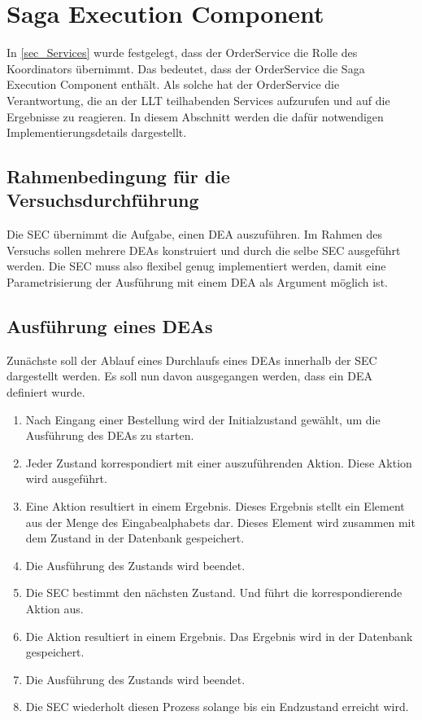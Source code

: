 \section{Saga Execution Component}

In \ref{sec_Services} wurde festgelegt, dass der OrderService die Rolle des Koordinators übernimmt. Das bedeutet, dass der OrderService die Saga Execution Component enthält. Als solche hat der OrderService die Verantwortung, die an der LLT teilhabenden Services aufzurufen und auf die Ergebnisse zu reagieren. In diesem Abschnitt werden die dafür notwendigen Implementierungsdetails dargestellt.

\subsection{Rahmenbedingung für die Versuchsdurchführung}
Die SEC übernimmt die Aufgabe, einen DEA auszuführen. Im Rahmen des Versuchs sollen mehrere DEAs konstruiert und durch die selbe SEC ausgeführt werden. Die SEC muss also flexibel genug implementiert werden, damit eine Parametrisierung der Ausführung mit einem DEA als Argument möglich ist. 

\subsection{Ausführung eines DEAs}
Zunächste soll der Ablauf eines Durchlaufs eines DEAs innerhalb der SEC dargestellt werden. Es soll nun davon ausgegangen werden, dass ein DEA definiert wurde. 

\begin{enumerate}
	\item Nach Eingang einer Bestellung wird der Initialzustand gewählt, um die Ausführung des DEAs zu starten.
	\item Jeder Zustand korrespondiert mit einer auszuführenden Aktion. Diese Aktion wird ausgeführt. 
	\item Eine Aktion resultiert in einem Ergebnis. Dieses Ergebnis stellt ein Element aus der Menge des Eingabealphabets dar. Dieses Element wird zusammen mit dem Zustand in der Datenbank gespeichert. 
	\item Die Ausführung des Zustands wird beendet.
	\item Die SEC bestimmt den nächsten Zustand. Und führt die korrespondierende Aktion aus.
	\item Die Aktion resultiert in einem Ergebnis. Das Ergebnis wird in der Datenbank gespeichert. 
	\item Die Ausführung des Zustands wird beendet. 
	\item Die SEC wiederholt diesen Prozess solange bis ein Endzustand erreicht wird. 
\end{enumerate}

